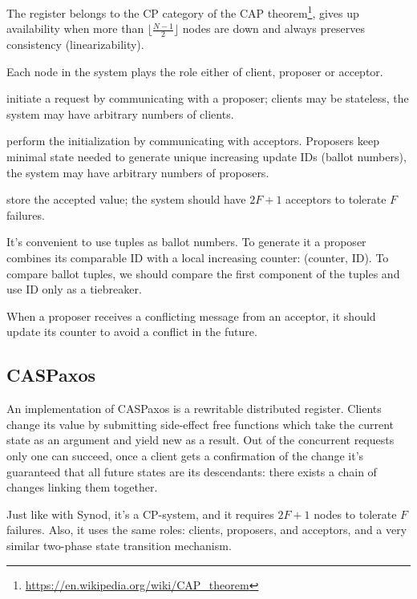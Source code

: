 \documentclass[a4paper,USenglish]{lipics-v2018}
\theoremstyle{definition}
\begin{document}
    The register belongs to the CP category of the CAP theorem\footnote{\href{https://en.wikipedia.org/wiki/CAP\_theorem}{https://en.wikipedia.org/wiki/CAP\_theorem}}, gives up availability when more than $\lfloor \frac{N-1}2 \rfloor$ nodes are down and always preserves consistency (linearizability).
    
    Each node in the system plays the role either of client, proposer or acceptor.
    
    \begin{description}[align=left]
        \item [Clients] initiate a request by communicating with a proposer; clients may be stateless, the system may have arbitrary numbers of clients.
        \item [Proposers] perform the initialization by communicating with acceptors. Proposers keep minimal state needed to generate unique increasing update IDs (ballot numbers), the system may have arbitrary numbers of proposers.
        \item [Acceptors] store the accepted value; the system should have $2F+1$ acceptors to tolerate $F$ failures.
    \end{description}
    
    It's convenient to use tuples as ballot numbers. To generate it a proposer combines its comparable ID with a local increasing counter: (counter, ID). To compare ballot tuples, we should compare the first component of the tuples and use ID only as a tiebreaker.
    
    When a proposer receives a conflicting message from an acceptor, it should update its counter to avoid a conflict in the future.

\subsection{CASPaxos}

    An implementation of CASPaxos is a rewritable distributed register. Clients change its value by submitting side-effect free functions which take the current state as an argument and yield new as a result. Out of the concurrent requests only one can succeed, once a client gets a confirmation of the change it's guaranteed that all future states are its descendants: there exists a chain of changes linking them together.

    Just like with Synod, it's a CP-system, and it requires $2F+1$ nodes to tolerate $F$ failures. Also, it uses the same roles: clients, proposers, and acceptors, and a very similar two-phase state transition mechanism.
\end{document}
